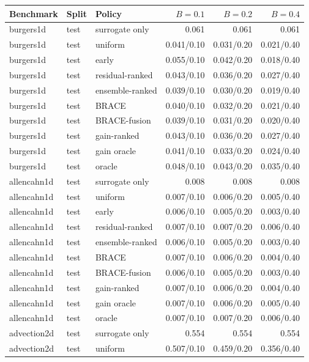 \begin{tabular}{lllrrr}
\toprule
Benchmark & Split & Policy & $B=0.1$ & $B=0.2$ & $B=0.4$ \\
\midrule
burgers1d & test & surrogate only & 0.061 & 0.061 & 0.061 \\
burgers1d & test & uniform & 0.041/0.10 & 0.031/0.20 & 0.021/0.40 \\
burgers1d & test & early & 0.055/0.10 & 0.042/0.20 & 0.018/0.40 \\
burgers1d & test & residual-ranked & 0.043/0.10 & 0.036/0.20 & 0.027/0.40 \\
burgers1d & test & ensemble-ranked & 0.039/0.10 & 0.030/0.20 & 0.019/0.40 \\
burgers1d & test & BRACE & 0.040/0.10 & 0.032/0.20 & 0.021/0.40 \\
burgers1d & test & BRACE-fusion & 0.039/0.10 & 0.031/0.20 & 0.020/0.40 \\
burgers1d & test & gain-ranked & 0.043/0.10 & 0.036/0.20 & 0.027/0.40 \\
burgers1d & test & gain oracle & 0.041/0.10 & 0.033/0.20 & 0.024/0.40 \\
burgers1d & test & oracle & 0.048/0.10 & 0.043/0.20 & 0.035/0.40 \\
\midrule
allencahn1d & test & surrogate only & 0.008 & 0.008 & 0.008 \\
allencahn1d & test & uniform & 0.007/0.10 & 0.006/0.20 & 0.005/0.40 \\
allencahn1d & test & early & 0.006/0.10 & 0.005/0.20 & 0.003/0.40 \\
allencahn1d & test & residual-ranked & 0.007/0.10 & 0.007/0.20 & 0.006/0.40 \\
allencahn1d & test & ensemble-ranked & 0.006/0.10 & 0.005/0.20 & 0.003/0.40 \\
allencahn1d & test & BRACE & 0.007/0.10 & 0.006/0.20 & 0.004/0.40 \\
allencahn1d & test & BRACE-fusion & 0.006/0.10 & 0.005/0.20 & 0.003/0.40 \\
allencahn1d & test & gain-ranked & 0.007/0.10 & 0.006/0.20 & 0.004/0.40 \\
allencahn1d & test & gain oracle & 0.007/0.10 & 0.006/0.20 & 0.005/0.40 \\
allencahn1d & test & oracle & 0.007/0.10 & 0.007/0.20 & 0.006/0.40 \\
\midrule
advection2d & test & surrogate only & 0.554 & 0.554 & 0.554 \\
advection2d & test & uniform & 0.507/0.10 & 0.459/0.20 & 0.356/0.40 \\

\end{tabular}
